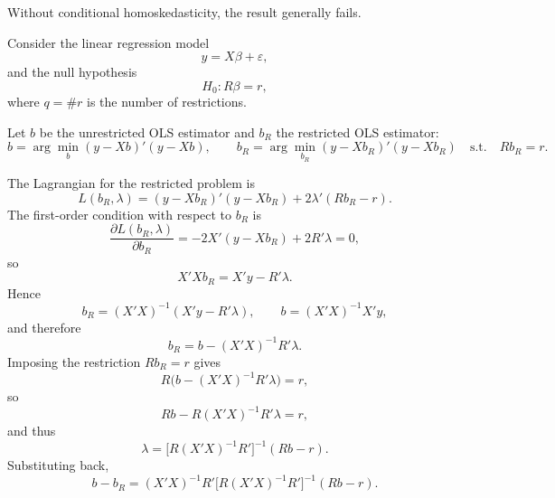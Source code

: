 \documentclass[12pt, letterpaper, onecolumn]{exam}
\begin{document}
\begin{solution}
    Without conditional homoskedasticity, the result generally fails.

    Consider the linear regression model
    \[
        y = X\beta + \varepsilon,
    \]
    and the null hypothesis
    \[
        H_{0}: R\beta = r,
    \]
    where $q=\#r$ is the number of restrictions.

    Let $b$ be the unrestricted OLS estimator and $b_{R}$ the restricted OLS
    estimator:
    \[
        b=\arg\min_{b}(y-Xb)'(y-Xb), \qquad b_{R}=\arg\min_{b_R}(y-Xb_{R})'(
        y-Xb_{R})\quad\text{s.t.}\quad Rb_{R}=r.
    \]

    The Lagrangian for the restricted problem is
    \[
        L(b_{R},\lambda)=(y-Xb_{R})'(y-Xb_{R})+2\lambda'(Rb_{R}-r).
    \]
    The first-order condition with respect to $b_{R}$ is
    \[
        \frac{\partial L(b_{R},\lambda)}{\partial b_{R}}=-2X'(y-Xb_{R})+2R'\lambda
        =0,
    \]
    so
    \[
        X'Xb_{R}=X'y-R'\lambda.
    \]
    Hence
    \[
        b_{R}=(X'X)^{-1}(X'y-R'\lambda), \qquad b=(X'X)^{-1}X'y,
    \]
    and therefore
    \[
        b_{R}=b-(X'X)^{-1}R'\lambda.
    \]
    Imposing the restriction $Rb_{R}=r$ gives
    \[
        R\Big(b-(X'X)^{-1}R'\lambda\Big)=r,
    \]
    so
    \[
        Rb-R(X'X)^{-1}R'\lambda=r,
    \]
    and thus
    \[
        \lambda=\Big[R(X'X)^{-1}R'\Big]^{-1}(Rb-r).
    \]
    Substituting back,
    \[
        b-b_{R}=(X'X)^{-1}R'\Big[R(X'X)^{-1}R'\Big]^{-1}(Rb-r).
    \]


\end{solution}
\end{document}
